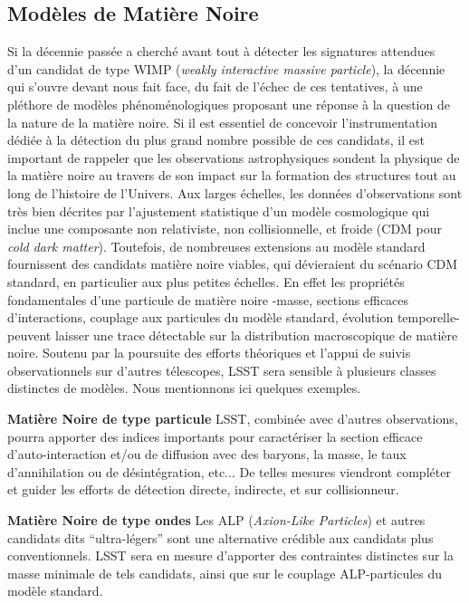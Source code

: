 \documentclass[12pt]{article}
\begin{document}
\vspace{-1em} \subsection*{Modèles de Matière Noire} \vspace{-0.5em}

Si la décennie passée a cherché avant tout à détecter les signatures attendues d'un candidat de type WIMP ({\it weakly interactive massive particle}), la décennie qui s'ouvre devant nous fait face, du fait de l'échec de ces tentatives, à une pléthore de modèles phénoménologiques proposant une réponse à la question de la nature de la matière noire. Si il est essentiel de concevoir l'instrumentation dédiée à la détection du plus grand nombre possible de ces candidats, il est important de rappeler que les observations astrophysiques sondent la physique de la matière noire au travers de son impact sur la formation des structures tout au long de l'histoire de l'Univers. Aux larges échelles, les données d'observations sont très bien décrites par l'ajustement statistique d'un modèle cosmologique qui inclue une composante non relativiste, non collisionnelle, et froide (CDM pour {\it cold dark matter}). Toutefois, de nombreuses extensions au modèle standard fournissent des candidats matière noire viables, qui dévieraient du scénario CDM standard, en particulier aux plus petites échelles. En effet les propriétés fondamentales d'une particule de matière noire -masse, sections efficaces d'interactions, couplage aux particules du modèle standard, évolution temporelle- peuvent laisser une trace détectable sur la distribution macroscopique de matière noire. Soutenu par la poursuite des efforts théoriques et l'appui de suivis observationnels sur d'autres télescopes, LSST sera sensible à plusieurs classes distinctes de modèles. Nous mentionnons ici quelques exemples.

\noindent \textbf{Matière Noire de type particule} LSST, combinée avec d'autres observations, pourra apporter des indices importants pour caractériser la section efficace d'auto-interaction et/ou de diffusion avec des baryons, la masse, le taux d'annihilation ou de désintégration, etc... De telles mesures viendront compléter et guider les efforts de détection directe, indirecte, et sur collisionneur.

\noindent \textbf{Matière Noire de type ondes} Les ALP ({\it Axion-Like Particles}) et autres candidats dits ``ultra-légers'' sont une alternative crédible aux candidats plus conventionnels. LSST sera en mesure d'apporter des contraintes distinctes sur la masse minimale de tels candidats, ainsi que sur le couplage ALP-particules du modèle standard.
\end{document}
